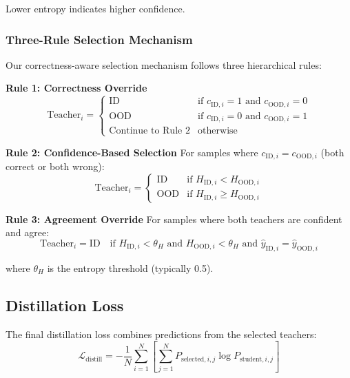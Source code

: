 \documentclass[11pt,a4paper]{article}
\begin{document}
Lower entropy indicates higher confidence.

\subsubsection{Three-Rule Selection Mechanism}

Our correctness-aware selection mechanism follows three hierarchical rules:

\textbf{Rule 1: Correctness Override}
\begin{equation}
\text{Teacher}_i = \begin{cases}
\text{ID} & \text{if } c_{\text{ID}, i} = 1 \text{ and } c_{\text{OOD}, i} = 0 \\
\text{OOD} & \text{if } c_{\text{ID}, i} = 0 \text{ and } c_{\text{OOD}, i} = 1 \\
\text{Continue to Rule 2} & \text{otherwise}
\end{cases}
\end{equation}

\textbf{Rule 2: Confidence-Based Selection}
For samples where $c_{\text{ID}, i} = c_{\text{OOD}, i}$ (both correct or both wrong):
\begin{equation}
\text{Teacher}_i = \begin{cases}
\text{ID} & \text{if } H_{\text{ID}, i} < H_{\text{OOD}, i} \\
\text{OOD} & \text{if } H_{\text{ID}, i} \geq H_{\text{OOD}, i}
\end{cases}
\end{equation}

\textbf{Rule 3: Agreement Override}
For samples where both teachers are confident and agree:
\begin{equation}
\text{Teacher}_i = \text{ID} \quad \text{if } H_{\text{ID}, i} < \theta_H \text{ and } H_{\text{OOD}, i} < \theta_H \text{ and } \hat{y}_{\text{ID}, i} = \hat{y}_{\text{OOD}, i}
\end{equation}

where $\theta_H$ is the entropy threshold (typically 0.5).

\subsection{Distillation Loss}

The final distillation loss combines predictions from the selected teachers:
\begin{equation}
\mathcal{L}_{\text{distill}} = -\frac{1}{N} \sum_{i=1}^{N} \left[ \sum_{j=1}^{N} P_{\text{selected}, i,j} \log P_{\text{student}, i,j} \right]
\end{equation}
\end{document}
